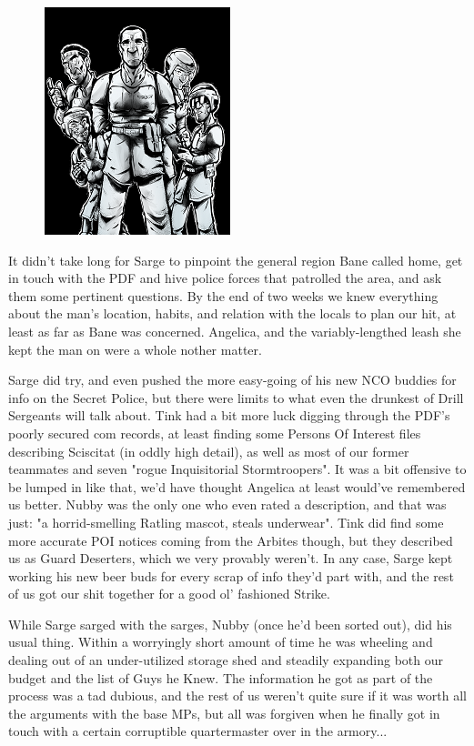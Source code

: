 \begin{figure}
	\begin{center}
		\includegraphics[width=\figwidth]{pics/19/25.png}
	\end{center}
\end{figure}
It didn't take long for Sarge to pinpoint the general region Bane called home, get in touch with the PDF and hive police forces that patrolled the area, and ask them some pertinent questions. 
By the end of two weeks we knew everything about the man's location, habits, and relation with the locals to plan our hit, at least as far as Bane was concerned. 
Angelica, and the variably-lengthed leash she kept the man on were a whole nother matter. 


Sarge did try, and even pushed the more easy-going of his new NCO buddies for info on the Secret Police, but there were limits to what even the drunkest of Drill Sergeants will talk about. 
Tink had a bit more luck digging through the PDF's poorly secured com records, at least finding some Persons Of Interest files describing Sciscitat (in oddly high detail), as well as most of our former teammates and seven "rogue Inquisitorial Stormtroopers". 
It was a bit offensive to be lumped in like that, we'd have thought Angelica at least would've remembered us better. 
Nubby was the only one who even rated a description, and that was just: 
"a horrid-smelling Ratling mascot, steals underwear". 
Tink did find some more accurate POI notices coming from the Arbites though, but they described us as Guard Deserters, which we very provably weren't. 
In any case, Sarge kept working his new beer buds for every scrap of info they'd part with, and the rest of us got our shit together for a good ol' fashioned Strike.

While Sarge sarged with the sarges, Nubby (once he'd been sorted out), did his usual thing. 
Within a worryingly short amount of time he was wheeling and dealing out of an under-utilized storage shed and steadily expanding both our budget and the list of Guys he Knew. 
The information he got as part of the process was a tad dubious, and the rest of us weren't quite sure if it was worth all the arguments with the base MPs, but all was forgiven when he finally got in touch with a certain corruptible quartermaster over in the armory... 


